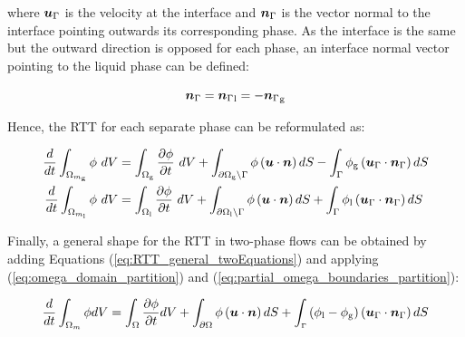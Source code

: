 where $\boldsymbol{u}_{\scriptsize{\Gamma}}$ is the velocity at the interface and $\boldsymbol{n}_{\scriptsize{\Gamma}}$ is the vector normal to the interface pointing outwards its corresponding phase. As the interface is the same but the outward direction is opposed for each phase, an interface normal vector pointing to the liquid phase can be defined: 

\begin{equation}
\boldsymbol{n}_{\scriptsize{\Gamma}} = {\boldsymbol{n}_{\scriptsize{\Gamma}}}_\mathrm{l} = - {\boldsymbol{n}_{\scriptsize{\Gamma}}}_\mathrm{g}
\end{equation}

Hence, the RTT for each separate phase can be reformulated as:

\begin{subequations}
\label{eq:RTT_general_twoEquations}
\begin{align}
\frac{d}{dt} \int_{\Omega_{m_\mathrm{g}}} \phi ~ dV &=  \int_{\Omega_\mathrm{g}} \frac{\partial \phi}{\partial t} ~ dV + \int_{\partial \Omega_\mathrm{g} \backslash \Gamma} \phi \left( \boldsymbol{u} \cdot \boldsymbol{n} \right) dS - \int_{\Gamma} \phi_\mathrm{g} \left( \boldsymbol{u}_{\scriptsize{\Gamma}} \cdot \boldsymbol{n}_{\scriptsize{\Gamma}} \right) dS \\
\frac{d}{dt} \int_{\Omega_{m_\mathrm{l}}} \phi ~ dV &=  \int_{\Omega_\mathrm{l}} \frac{\partial \phi}{\partial t} ~ dV + \int_{\partial \Omega_\mathrm{l} \backslash \Gamma} \phi \left( \boldsymbol{u} \cdot \boldsymbol{n} \right) dS + \int_{\Gamma} \phi_\mathrm{l} \left( \boldsymbol{u}_{\scriptsize{\Gamma}} \cdot \boldsymbol{n}_{\scriptsize{\Gamma}}\right) dS
\end{align}
\end{subequations}

Finally, a general shape for the RTT in two-phase flows can be obtained by adding Equations (\ref{eq:RTT_general_twoEquations}) and applying (\ref{eq:omega_domain_partition}) and (\ref{eq:partial_omega_boundaries_partition}):

\begin{equation}
\label{eq:RTT_general_bothPhases}
\frac{d}{dt} \int_{\Omega_m} \phi dV =  \int_{\Omega} \frac{\partial \phi}{\partial t}  dV + \int_{\partial \Omega} \phi \left( \boldsymbol{u} \cdot \boldsymbol{n} \right) dS + \int_\mathsmaller{\Gamma} \left( \phi_\mathrm{l} - \phi_\mathrm{g} \right) \left( \boldsymbol{u}_{\scriptsize{\Gamma}} \cdot \boldsymbol{n}_{\scriptsize{\Gamma}} \right) dS
\end{equation}





